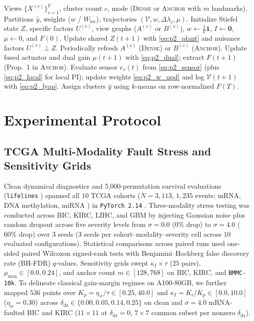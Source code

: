 \documentclass[journal]{IEEEtran}
\begin{document}
\begin{algorithm}[t]
\caption{CL-VSSC / CL-VSSC-Anchor Closed-Loop Control}
\label{alg:cl_vssc}
\begin{algorithmic}[1]
\REQUIRE Views $\{X^{(v)}\}_{v=1}^V$, cluster count $c$, mode (\textsc{Dense} or \textsc{Anchor} with $m$ landmarks).
\ENSURE Partitions $\hat{y}$, weights ($w$ / $W_{\mathrm{loc}}$), trajectories $(\mathcal{V}, w, \Delta\lambda_c, \mu)$.
\STATE Initialize Stiefel state $Z$, specific factors $U^{(v)}$, view graphs ($A^{(v)}$ or $B^{(v)}$), $w \leftarrow \frac{1}{V}\mathbf{1}$, $I \leftarrow \mathbf{0}$, $\mu \leftarrow 0$, and $F(0)$.
    \STATE Update shared $Z(t+1)$ with \eqref{eq:p2_plant} and nuisance factors $U^{(v)} \perp Z$.
    \STATE Periodically refresh $A^{(v)}$ (\textsc{Dense}) or $B^{(v)}$ (\textsc{Anchor}).
    \STATE Update fused actuator and dual gain $\mu(t+1)$ with \eqref{eq:p2_dual}; extract $F(t+1)$ (Prop.~1 in \textsc{Anchor}).
    \STATE Evaluate sensor $e_v(t)$ from \eqref{eq:p2_sensor} (plus \eqref{eq:p2_local} for local PI); update weights \eqref{eq:p2_w_upd} and log $\mathcal{V}(t+1)$ with \eqref{eq:p2_lyap}.
\ENDFOR
\STATE Assign clusters $\hat{y}$ using $k$-means on row-normalized $F(T)$.
\end{algorithmic}
\end{algorithm}

\section{Experimental Protocol}

\subsection{TCGA Multi-Modality Fault Stress and Sensitivity Grids}
Clean dynamical diagnostics and 5{,}000-permutation survival evaluations (\texttt{lifelines} \cite{davidsonpilon2019lifelines}) spanned all $10$ TCGA cohorts ($N=3{,}113$, $1{,}235$ events; mRNA, DNA methylation, miRNA \cite{rappoport2018multi}) in \texttt{PyTorch 2.14} \cite{paszke2019pytorch}. Three-modality stress testing was conducted across BIC, KIRC, LIHC, and GBM by injecting Gaussian noise plus random dropout across five severity levels from $\sigma=0.0$ ($0\%$ drop) to $\sigma=4.0$ ($60\%$ drop) over $3$ seeds ($3$ seeds per cohort--modality--severity cell across $10$ evaluated configurations). Statistical comparisons across paired runs used one-sided paired Wilcoxon signed-rank tests with Benjamini--Hochberg false discovery rate (BH-FDR) $q$-values. Sensitivity grids swept $\kappa_I \times \tau$ ($25$ pairs), $\mu_{\max} \in [0.0, 0.24]$, and anchor count $m \in [128, 768]$ on BIC, KIRC, and \texttt{BMMC-10k}. To delineate classical gain-margin regimes on A100-80GB, we further mapped $536$ points over $K_p = \eta_w/\tau \in [0.25, 40.0]$ and $\kappa_I = K_i / K_p \in [0.0, 10.0]$ ($\eta_w = 0.30$) across $\delta_{\mathrm{dz}} \in \{0.00, 0.05, 0.14, 0.25\}$ on clean and $\sigma=4.0$ mRNA-faulted BIC and KIRC ($11\times 11$ at $\delta_{\mathrm{dz}}=0$, $7\times 7$ common subset per nonzero $\delta_{\mathrm{dz}}$).
\end{document}
